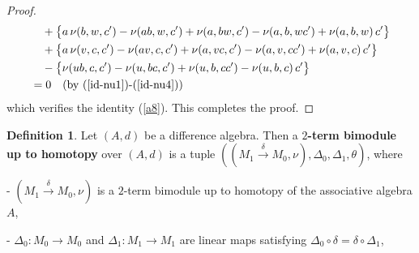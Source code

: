 \documentclass[a4paper,reqno,10pt]{amsart}
\theoremstyle{plain}
\theoremstyle{definition}
\newtheorem{defn}[thm]{Definition}
\theoremstyle{remark}
\begin{document}
\begin{proof}
\begin{align*}
& \quad  + \big\{   a ~ \! \nu (b, w, c') - \nu (ab, w, c') + \nu (a, bw , c') - \nu (a, b, wc') + \nu (a, b, w) ~  \!  c' \big\} \\
& \quad + \big\{  a ~\! \nu (v, c, c')  - \nu (av, c, c')   + \nu (a, v c , c') - \nu (a, v, cc')  + \nu (a, v, c) ~ \! c' \big\} \\
& \quad - \big\{ \nu (ub, c, c' ) - \nu (u, bc, c') + \nu (u, b, cc') - \nu (u, b, c) ~ \! c'  \big\} \\
        &= 0 \quad (\text{by } (\ref{id-nu1})\text{-}(\ref{id-nu4}))
    \end{align*}
    which verifies the identity (\ref{a8}). This completes the proof.
\end{proof}

\begin{defn}
    Let $(A, d)$ be a difference algebra. Then a {\bf $2$-term bimodule up to homotopy} over $(A, d)$ is a tuple $((M_1 \xrightarrow{\delta} M_0, \nu), \Delta_0, \Delta_1, \theta)$, where 

    \medskip


    - $(M_1 \xrightarrow{\delta} M_0, \nu)$ is a $2$-term bimodule up to homotopy of the associative algebra $A$,

    \medskip

    - $\Delta_0 : M_0 \rightarrow M_0$ and $\Delta_1 : M_1 \rightarrow M_1$ are linear maps satisfying $\Delta_0 \circ \delta = \delta \circ \Delta_1$,

    \medskip


\end{defn}
\end{document}
